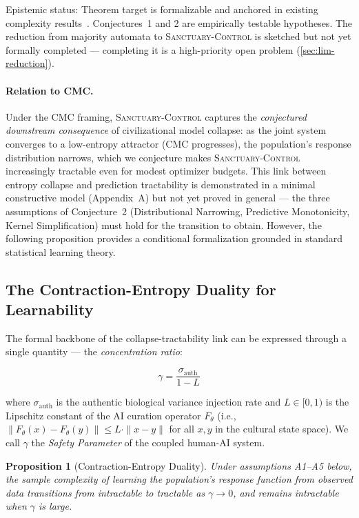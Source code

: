 \documentclass[11pt, a4paper]{article}
\newtheorem{proposition}{Proposition}[section]
\theoremstyle{remark}
\newcommand{\SC}{\textsc{Sanctuary-Control}}
\begin{document}
Epistemic status: Theorem target is formalizable and anchored in existing complexity results~\cite{goles2016}. Conjectures~1 and 2 are empirically testable hypotheses. The reduction from majority automata to \SC{} is sketched but not yet formally completed --- completing it is a high-priority open problem (\cref{sec:lim-reduction}).

\paragraph{Relation to CMC.} Under the CMC framing, \SC{} captures the \emph{conjectured downstream consequence} of civilizational model collapse: as the joint system converges to a low-entropy attractor (CMC progresses), the population's response distribution narrows, which we conjecture makes \SC{} increasingly tractable even for modest optimizer budgets. This link between entropy collapse and prediction tractability is demonstrated in a minimal constructive model (Appendix~A) but not yet proved in general --- the three assumptions of Conjecture~2 (Distributional Narrowing, Predictive Monotonicity, Kernel Simplification) must hold for the transition to obtain. However, the following proposition provides a conditional formalization grounded in standard statistical learning theory.

\subsection{The Contraction-Entropy Duality for Learnability}\label{sec:contraction-duality}

The formal backbone of the collapse-tractability link can be expressed through a single quantity --- the \emph{concentration ratio}:

\begin{equation}
\gamma = \frac{\sigma_{\text{auth}}}{1 - L}
\label{eq:gamma}
\end{equation}

where $\sigma_{\text{auth}}$ is the authentic biological variance injection rate and $L \in [0, 1)$ is the Lipschitz constant of the AI curation operator $F_\theta$ (i.e., $\|F_\theta(x) - F_\theta(y)\| \leq L \cdot \|x - y\|$ for all $x, y$ in the cultural state space). We call $\gamma$ the \emph{Safety Parameter} of the coupled human-AI system.

\begin{proposition}[Contraction-Entropy Duality]
Under assumptions A1--A5 below, the sample complexity of learning the population's response function from observed data transitions from intractable to tractable as $\gamma \to 0$, and remains intractable when $\gamma$ is large.
\end{proposition}
\end{document}

